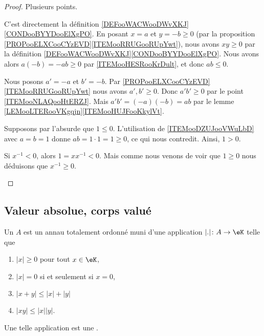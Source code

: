 \begin{proof}
	Plusieurs points.
	\begin{subproof}
		C'est directement la définition \ref{DEFooWACWooDWvXKJ}\ref{CONDooBYYDooElXgPO}.
		En posant \( x = a \) et \( y=-b \geq 0\)  (par la proposition \ref{PROPooELXCooCYzEVD}\ref{ITEMooRRUGooRUpYwt}), nous avons \( xy\geq 0\) par la définition \ref{DEFooWACWooDWvXKJ}\ref{CONDooBYYDooElXgPO}. Nous avons alors \( a(-b) = -ab \geq 0\) par \ref{ITEMooHESRooKrDult}, et donc \( ab \leq 0 \).

		Nous posons \( a'=-a\) et \( b'=-b\). Par \ref{PROPooELXCooCYzEVD}\ref{ITEMooRRUGooRUpYwt} nous avons \( a',b'\geq 0\). Donc \( a'b'\geq 0\) par le point \ref{ITEMooNLAQooHtERZJ}. Mais \( a'b'=(-a)(-b)=ab\) par le lemme \ref{LEMooLTERooVKgqjn}\ref{ITEMooHUJFooKkylVt}.

		Supposons par l'absurde que \( 1\leq 0\). L'utilisation de \ref{ITEMooDZUJooVWuLbD} avec \( a = b = 1 \) donne \( ab = 1\cdot 1 = 1 \geq 0 \), ce qui nous contredit. Ainsi, \( 1> 0\).

		Si \( x^{-1}<0\), alors \( 1=xx^{-1}<0\). Mais comme nous venons de voir que \( 1\geq 0\) nous déduisons que \( x^{-1}\geq 0\).
	\end{subproof}
\end{proof}


\subsection{Valeur absolue, corps valué}
\label{SUBooValAbsCorpsValue}

\begin{definition}       \label{DEFooBWXXooAkBBRS}
	Un  \( A\) est un annau totalement ordonné muni d'une application \( | . |\colon A\to \eK\) telle que
	\begin{enumerate}
		\item
		      \( | x |\geq 0\) pour tout \( x\in \eK\),
		\item
		      \( | x |=0\) si et seulement si \( x=0\),
		\item
		      \( | x+y |\leq | x |+| y |\)
		\item
		      \( | xy |\leq | x | | y |\).
	\end{enumerate}
	Une telle application est une .
\end{definition}

